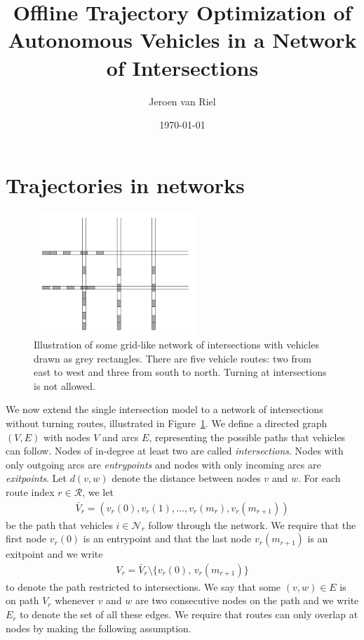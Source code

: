 \documentclass[a4paper]{article}
\author{Jeroen van Riel}
\date{\monthyeardate\today}
\title{Offline Trajectory Optimization of Autonomous Vehicles in a Network of Intersections}
\theoremstyle{definition}
\theoremstyle{plain}
\begin{document}
\maketitle

\tableofcontents

\section{Trajectories in networks}

\begin{figure}
  \centering
  \includegraphics[width=0.55\textwidth]{figures/state_example.png}
  \caption{Illustration of some grid-like network of intersections with vehicles
    drawn as grey rectangles. There are five vehicle routes: two from east to
    west and three from south to north. Turning at intersections is not
    allowed.}\label{fig:network_illustration}
\end{figure}

We now extend the single intersection model to a network of intersections
without turning routes, illustrated in Figure~\ref{fig:network_illustration}.
We define a directed graph $(V,E)$ with nodes $V$ and arcs $E$, representing the
possible paths that vehicles can follow. Nodes of in-degree at least two are
called \textit{intersections}. Nodes with only outgoing arcs are
\textit{entrypoints} and nodes with only incoming arcs are \textit{exitpoints}.
%
Let $d(v, w)$ denote the distance between nodes $v$ and $w$.
%
For each route index $r \in \mathcal{R}$, we let
\begin{align*}
  \bar{V}_{r} = (v_{r}(0), v_{r}(1), \dots, v_{r}(m_{r}), v_{r}(m_{r+1}))
\end{align*}
be the path that vehicles $i \in \mathcal{N}_{r}$ follow through the network. We
require that the first node $v_{r}(0)$ is an entrypoint and that the last node
$v_{r}(m_{r+1})$ is an exitpoint and we write
\begin{align*}
  V_{r} = \bar{V}_{r} \setminus \{ v_{r}(0), \, v_{r}(m_{r+1}) \}
\end{align*}
to denote the path restricted to intersections. We say that some $(v, w) \in E$
is on path $V_{r}$ whenever $v$ and $w$ are two consecutive nodes on the path
and we write $E_{r}$ to denote the set of all these edges. We require that
routes can only overlap at nodes by making the following assumption.
\end{document}
